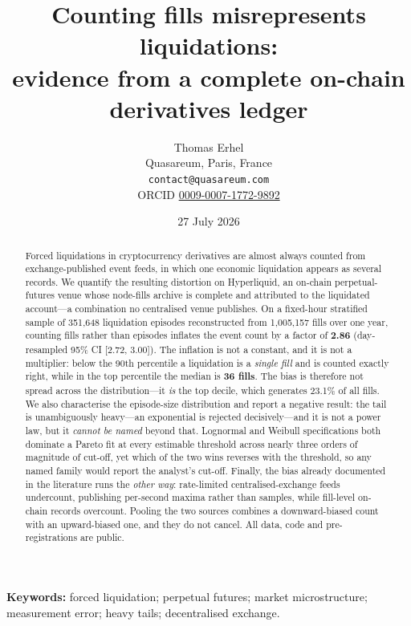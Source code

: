 \documentclass[11pt,a4paper]{article}
\title{\bfseries Counting fills misrepresents liquidations:\\
evidence from a complete on-chain derivatives ledger}
\author{Thomas Erhel\\ \small Quasareum, Paris, France\\ \small \texttt{contact@quasareum.com}\\
  \small ORCID \href{https://orcid.org/0009-0007-1772-9892}{0009-0007-1772-9892}}
\date{27 July 2026}
\begin{document}
\maketitle
\sloppy

\renewcommand{\thefootnote}{}
\renewcommand{\thefootnote}{\arabic{footnote}}

\begin{abstract}
\noindent
Forced liquidations in cryptocurrency derivatives are almost always counted from
exchange-published event feeds, in which one economic liquidation appears as several records.
We quantify the resulting distortion on Hyperliquid, an on-chain perpetual-futures venue whose
node-fills archive is complete and attributed to the liquidated account---a combination no
centralised venue publishes. On a fixed-hour stratified sample of 351{,}648 liquidation
episodes reconstructed from 1{,}005{,}157 fills over one year, counting fills rather than
episodes inflates the event count by a factor of \textbf{2.86} (day-resampled 95\% CI
[2.72, 3.00]). The inflation is not a constant, and it is not a multiplier: below the 90th
percentile a liquidation is a \emph{single fill} and is counted exactly right, while in the top
percentile the median is \textbf{36 fills}. The bias is therefore not spread across the
distribution---it \emph{is} the top decile, which generates 23.1\% of all fills. We also characterise the episode-size distribution and report a negative
result: the tail is unambiguously heavy---an exponential is rejected decisively---and it is not a power law, but
it \emph{cannot be named} beyond that. Lognormal and Weibull specifications both dominate a
Pareto fit at every estimable threshold across nearly three orders of magnitude of cut-off, yet
which of the two wins reverses with the threshold, so any named family would report the
analyst's cut-off. Finally, the bias already documented in the literature runs the \emph{other
way}: rate-limited
centralised-exchange feeds undercount, publishing per-second maxima rather than samples, while
fill-level on-chain records overcount. Pooling the two sources combines a downward-biased count
with an upward-biased one, and they do not cancel. All data, code and pre-registrations are
public.
\end{abstract}

\vspace{0.5em}
\noindent\textbf{Keywords:} forced liquidation; perpetual futures; market microstructure; measurement error; heavy tails; decentralised exchange.
\end{document}
